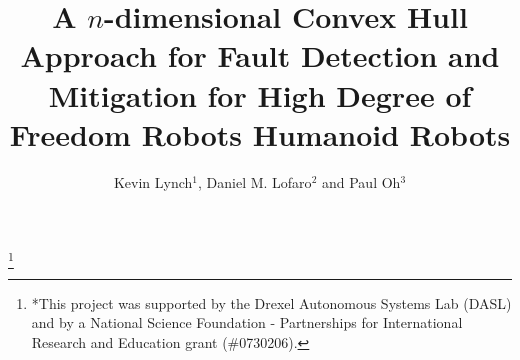 \documentclass[fleqn,10pt,twocolumn]{ICCAS2012}
\begin{document}
\title{A $n$-dimensional Convex Hull Approach for Fault Detection and Mitigation for High Degree of Freedom Robots Humanoid Robots}

\author{Kevin Lynch${}^{1}$, Daniel M. Lofaro${}^{2}$ and Paul Oh${}^{3}$}

\thanks{*This project was supported by the Drexel Autonomous Systems Lab (DASL) and by a National Science Foundation - Partnerships for International Research and Education grant (\#0730206).}%
\abstract{

}


\maketitle







%
%


%


%
%


%
{}



%
\end{document}

